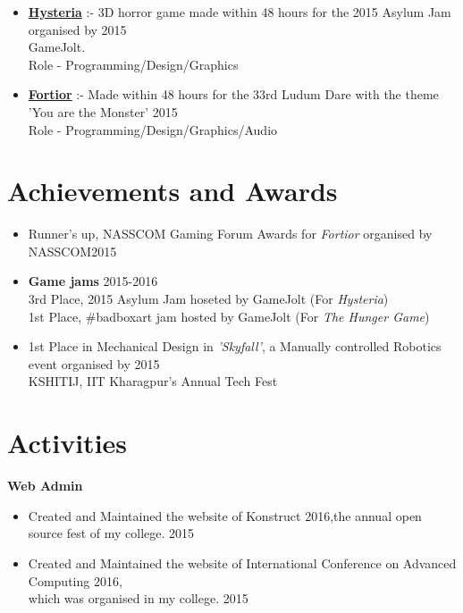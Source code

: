 \documentclass[margin, centered]{res}
\begin{document}
\begin{resume}
\begin{itemize}[leftmargin=*]
	\item \textbf{\href{http://gamejolt.com/games/hysteria/107191}{Hysteria}} :- 3D horror game made within 48 hours for the 2015 Asylum Jam organised by \hfill 2015 \\GameJolt. \\Role - Programming/Design/Graphics
	\item \textbf{\href{http://gamejolt.com/games/fortior/88093}{Fortior}} :- Made within 48 hours for the 33rd Ludum Dare with the theme 'You are the Monster' \hfill 2015
	\\Role - Programming/Design/Graphics/Audio
\end{itemize}

\section{Achievements and Awards}
\begin{itemize}[leftmargin=*]
\item Runner's up, NASSCOM Gaming Forum Awards for \textit{Fortior} organised by NASSCOM\hfill 2015
\item \textbf{Game jams} \hfill 2015-2016
\\
3rd Place, 2015 Asylum Jam hoseted by GameJolt (For \textit{Hysteria})\\
1st Place, \#badboxart jam hosted by GameJolt (For \textit{The Hunger Game})
\item 1st Place in Mechanical Design in \textit{'Skyfall'}, a Manually controlled Robotics event organised by \hfill2015 \\ KSHITIJ, IIT Kharagpur's Annual Tech Fest
\end{itemize}

\section{Activities}
\textbf{Web Admin}
\begin{itemize}[leftmargin=*]
\item Created and Maintained the website of Konstruct 2016,the  annual open source fest of my college. \hfill 2015
\item Created and Maintained the website of International Conference on Advanced Computing 2016,\\ which was organised in my college. \hfill 2015
\end{itemize} 

\end{resume}
\end{document}
